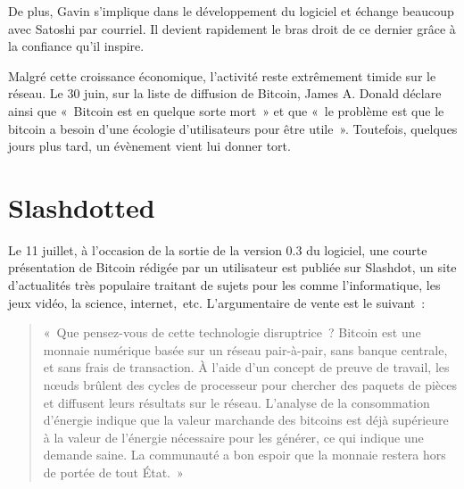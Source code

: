 De plus, Gavin s'implique dans le développement du logiciel et échange beaucoup avec Satoshi par courriel. Il devient rapidement le bras droit de ce dernier grâce à la confiance qu'il inspire.

Malgré cette croissance économique, l'activité reste extrêmement timide sur le réseau. Le 30 juin, sur la liste de diffusion de Bitcoin, James A. Donald déclare ainsi que «~Bitcoin est en quelque sorte mort~» et que «~le problème est que le bitcoin a besoin d'une écologie d'utilisateurs pour être utile~». Toutefois, quelques jours plus tard, un évènement vient lui donner tort.

\section{Slashdotted}

Le 11 juillet, à l'occasion de la sortie de la version 0.3 du logiciel, une courte présentation de Bitcoin rédigée par un utilisateur est publiée sur Slashdot, un site d'actualités très populaire traitant de sujets pour les  comme l'informatique, les jeux vidéo, la science, internet,~etc. L'argumentaire de vente est le suivant~:

\begin{quote}
«~Que pensez-vous de cette technologie disruptrice~? Bitcoin est une monnaie numérique basée sur un réseau pair-à-pair, sans banque centrale, et sans frais de transaction. À l'aide d'un concept de preuve de travail, les nœuds brûlent des cycles de processeur pour chercher des paquets de pièces et diffusent leurs résultats sur le réseau. L'analyse de la consommation d'énergie indique que la valeur marchande des bitcoins est déjà supérieure à la valeur de l'énergie nécessaire pour les générer, ce qui indique une demande saine. La communauté a bon espoir que la monnaie restera hors de portée de tout État.~»
\end{quote}


